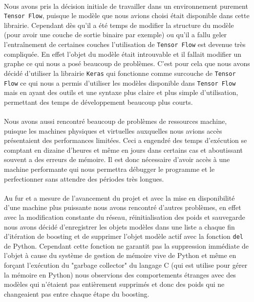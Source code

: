 \documentclass[11 pt]{article}
\begin{document}
\paragraph{}Nous avons pris la décision initiale de travailler dans un environnement purement \texttt{Tensor Flow}, puisque le modèle que nous avions choisi était disponible dans cette librairie. Cependant dès qu’il a été temps de modifier la structure du modèle (pour avoir une couche de sortie binaire par exemple) ou qu’il a fallu geler l'entraînement de certaines couches l’utilisation de \texttt{Tensor Flow} est devenue très compliquée. En effet l’objet du modèle était introuvable et il fallait modifier un graphe ce qui nous a posé beaucoup de problèmes. C’est pour cela que nous avons décidé d’utiliser la librairie \texttt{Keras} qui fonctionne comme surcouche de \texttt{Tensor Flow} ce qui nous a permis d’utiliser les modèles disponible dans \texttt{Tensor Flow} mais en ayant des outils et une syntaxe plus claire et plus simple d’utilisation, permettant des temps de développement beaucoup plus courts.

\paragraph{}Nous avons aussi rencontré beaucoup de problèmes de ressources machine, puisque les machines physiques et virtuelles auxquelles nous avions accès présentaient des performances limitées. Ceci a engendré des temps d'exécution se comptant en dizaine d’heures et même en jours dans certains cas et aboutissant souvent a des erreurs de mémoire. Il est donc nécessaire d’avoir accès à une machine performante qui nous permettra débugger le programme et le perfectionner sans attendre des périodes très longues.

\paragraph{}Au fur et a mesure de l'avancement du projet et avec la mise en disponibilité d'une machine plus puissante nous avons rencontré d'autres problèmes, en effet avec la modification constante du réseau, réinitialisation des poids et sauvegarde nous avons décidé d'enregistrer les objets modèles dans une liste a chaque fin d’itération de boosting et de supprimer l'objet modèle actif avec la fonction \texttt{del} de Python. Cependant cette fonction ne garantit pas la suppression immédiate de l'objet \`a cause du système de gestion de mémoire vive de Python et même en forçant l’exécution du "garbage collector" du langage C (qui est utilise pour gérer la mémoire en Python) nous observions des comportements étranges avec des modèles qui n’étaient pas entièrement supprim\'es et donc des poids qui ne changeaient pas entre chaque étape du boosting.
\end{document}
